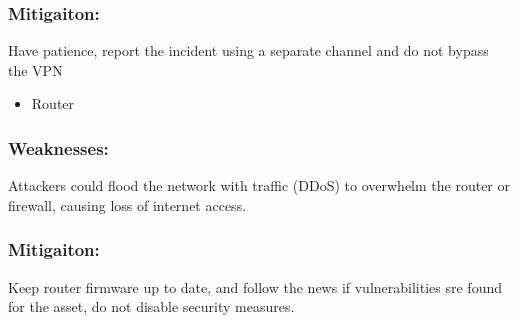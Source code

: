 \documentclass[
	letterpaper, %
	10pt, %
	unnumberedsections, %
	twoside, %
]{APAAssignment}
\begin{document}
\begin{singlespace}
	\subsubsection{Mitigaiton:} Have patience, report the incident using a separate channel and do not bypass the VPN

	\begin{itemize}
		\item Router
	\end{itemize}
	
	\subsubsection{Weaknesses:} Attackers could flood the network with traffic (DDoS) to overwhelm the router or firewall, causing loss of internet access.
	\subsubsection{Mitigaiton:} Keep router firmware up to date, and follow the news if vulnerabilities sre found for the asset, do not disable security measures.
	
	
\end{singlespace}
\end{document}
